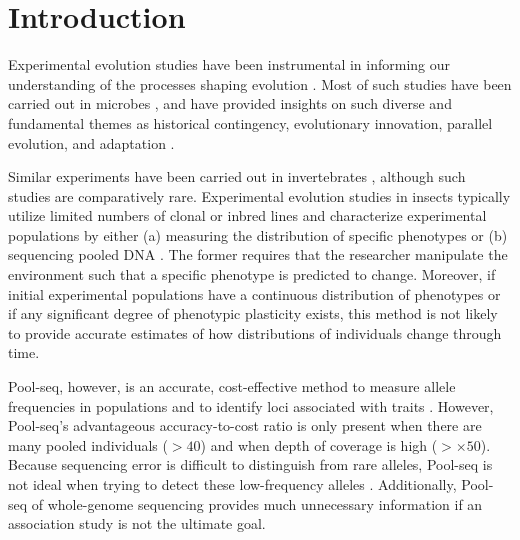

\section{Introduction}


Experimental evolution studies have been instrumental in informing our understanding
of the processes shaping evolution \citep{Elena:2003fr}. 
Most of such studies have been carried out in microbes
\citep[reviewed in][]{Dettman:2012gt,Jerison:2015kw}, and have provided insights on
such diverse and fundamental themes as historical contingency, evolutionary innovation,
parallel evolution, and adaptation
\citep{Blount:2008fo,Barrick:2009in,TollRiera:2016fd,Voordeckers:2015cl,Gerstein:2012ki}.


Similar experiments have been carried out in invertebrates
\citep{Gompert:2016eg,Chandler:2014bn,Burke:2010eq,Kang:2016ea,Rouchet:2014jl}, 
although such studies are comparatively rare.
Experimental evolution studies in insects typically utilize limited numbers of 
clonal or inbred lines \citep[e.g.,][]{Rouchet:2014jl,Kang:2016ea} and 
characterize experimental populations by either 
(a) measuring the distribution of specific phenotypes \citep[e.g.,][]{Rouchet:2014jl}
or
(b) sequencing pooled DNA \citep[``Pool-seq''; e.g.,][]{Burke:2010eq}.
The former requires that the researcher manipulate the environment such that a 
specific phenotype is predicted to change.
Moreover, if initial experimental populations have a continuous distribution of
phenotypes or if any significant degree of phenotypic plasticity exists, this method
is not likely to provide accurate estimates of how distributions of individuals change
through time.

Pool-seq, however, is an accurate, cost-effective method to measure allele frequencies
in populations \citep{Gautier:2013dv,Futschik:2010be}
and to identify loci associated with traits \citep{Rubin:2010es,Bastide:2013jx}.
However, Pool-seq's advantageous accuracy-to-cost ratio is only present when there
are many pooled individuals ($>40$) and when depth of coverage is high ($> \times 50$).
Because sequencing error is difficult to distinguish from rare alleles, 
Pool-seq is not ideal when trying to detect these low-frequency alleles
\citep{Schlotterer:2014dk}.
Additionally, Pool-seq of whole-genome sequencing provides much unnecessary 
information if an association study is not the ultimate goal.

